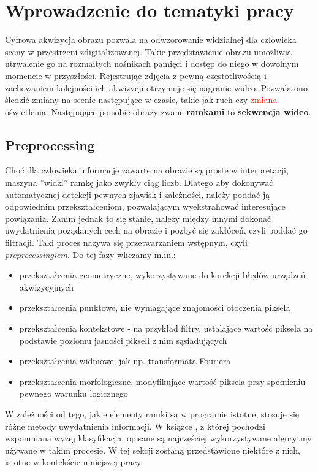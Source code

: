 \chapter{Wprowadzenie do tematyki pracy}
\label{cha:tematykaPracy}
Cyfrowa akwizycja obrazu pozwala na odwzorowanie widzialnej dla człowieka sceny w przestrzeni zdigitalizowanej. Takie przedstawienie obrazu umożliwia utrwalenie go na rozmaitych nośnikach pamięci i dostęp do niego w dowolnym momencie w przyszłości. Rejestrując zdjęcia z pewną częstotliwością i zachowaniem kolejności ich akwizycji otrzymuje się nagranie wideo. Pozwala ono śledzić zmiany na scenie następujące w czasie, takie jak ruch czy \textcolor{red}{zmiana} oświetlenia. Następujące po sobie obrazy zwane \textbf{ramkami} to \textbf{sekwencja wideo}.
\section{Preprocessing}
Choć dla człowieka informacje zawarte na obrazie są proste w interpretacji, maszyna ''widzi'' ramkę jako zwykły ciąg liczb. Dlatego aby dokonywać automatycznej detekcji pewnych zjawisk i zależności, należy poddać ją odpowiednim przekształceniom, pozwalającym wyekstrahować interesujące powiązania. Zanim jednak to się stanie, należy między innymi dokonać uwydatnienia pożądanych cech na obrazie i pozbyć się zakłóceń, czyli poddać go filtracji. Taki proces nazywa się przetwarzaniem wstępnym, czyli \textit{preprocessingiem}. Do tej fazy wliczamy m.in.:
\begin{itemize}
\item przekształcenia geometryczne, wykorzystywane do korekcji błędów urządzeń akwizycyjnych
\item przekształcenia punktowe, nie wymagające znajomości otoczenia piksela
\item przekształcenia kontekstowe - na przykład filtry, ustalające wartość piksela na podstawie poziomu jasności pikseli z nim sąsiadujących
\item przekształcenia widmowe, jak  np. transformata Fouriera
\item przekształcenia morfologiczne, modyfikujące wartość piksela przy spełnieniu pewnego warunku logicznego
\end{itemize}
W zależności od tego, jakie elementy ramki są w programie istotne, stosuje się różne metody uwydatnienia informacji. W książce \cite{i1823330731}, z której pochodzi wspomniana wyżej klasyfikacja, opisane są najczęściej wykorzystywane algorytmy używane w takim procesie. W tej sekcji zostaną przedstawione niektóre z nich, istotne w kontekście niniejszej pracy.

